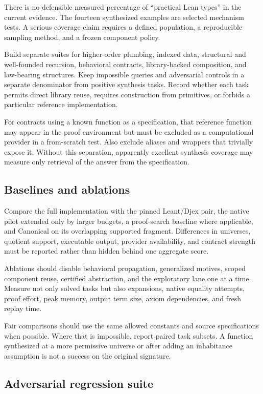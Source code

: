 \documentclass[11pt,a4paper]{article}
\theoremstyle{remark}
\begin{document}
There is no defensible measured percentage of ``practical Lean types'' in the current evidence. The fourteen synthesized examples are selected mechanism tests. A serious coverage claim requires a defined population, a reproducible sampling method, and a frozen component policy.

Build separate suites for higher-order plumbing, indexed data, structural and well-founded recursion, behavioral contracts, library-backed composition, and law-bearing structures. Keep impossible queries and adversarial controls in a separate denominator from positive synthesis tasks. Record whether each task permits direct library reuse, requires construction from primitives, or forbids a particular reference implementation.

For contracts using a known function as a specification, that reference function may appear in the proof environment but must be excluded as a computational provider in a from-scratch test. Also exclude aliases and wrappers that trivially expose it. Without this separation, apparently excellent synthesis coverage may measure only retrieval of the answer from the specification.

\subsection{Baselines and ablations}

Compare the full implementation with the pinned Leant/Djex pair, the native pilot extended only by larger budgets, a proof-search baseline where applicable, and Canonical on its overlapping supported fragment. Differences in universes, quotient support, executable output, provider availability, and contract strength must be reported rather than hidden behind one aggregate score.

Ablations should disable behavioral propagation, generalized motives, scoped component reuse, certified abstraction, and the exploratory lane one at a time. Measure not only solved tasks but also expansions, native equality attempts, proof effort, peak memory, output term size, axiom dependencies, and fresh replay time.

Fair comparisons should use the same allowed constants and source specifications when possible. Where that is impossible, report paired task subsets. A function synthesized at a more permissive universe or after adding an inhabitance assumption is not a success on the original signature.

\subsection{Adversarial regression suite}
\end{document}
